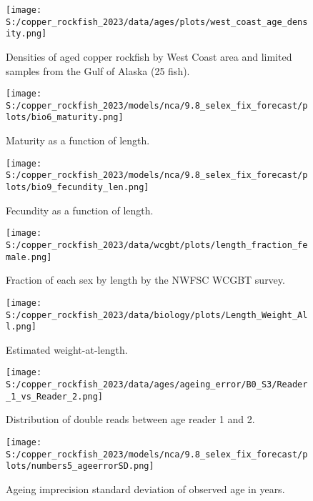 \documentclass[11pt,
  english,
  letterpaper,
]{article}
\begin{document}
\begin{figure}
\centering
\texttt{[image: S:/copper\_rockfish\_2023/data/ages/plots/west\_coast\_age\_density.png]}
\caption{Densities of aged copper rockfish by West Coast area and limited samples from the Gulf of Alaska (25 fish).\label{fig:west-coast-age-density}}
\end{figure}

\pagebreak

\begin{figure}
\centering
\texttt{[image: S:/copper\_rockfish\_2023/models/nca/9.8\_selex\_fix\_forecast/plots/bio6\_maturity.png]}
\caption{Maturity as a function of length.\label{fig:maturity}}
\end{figure}

\pagebreak

\begin{figure}
\centering
\texttt{[image: S:/copper\_rockfish\_2023/models/nca/9.8\_selex\_fix\_forecast/plots/bio9\_fecundity\_len.png]}
\caption{Fecundity as a function of length.\label{fig:fecundity}}
\end{figure}

\pagebreak

\begin{figure}
\centering
\texttt{[image: S:/copper\_rockfish\_2023/data/wcgbt/plots/length\_fraction\_female.png]}
\caption{Fraction of each sex by length by the NWFSC WCGBT survey.\label{fig:frac-sex-len}}
\end{figure}

\pagebreak

\begin{figure}
\centering
\texttt{[image: S:/copper\_rockfish\_2023/data/biology/plots/Length\_Weight\_All.png]}
\caption{Estimated weight-at-length.\label{fig:weight-length}}
\end{figure}

\pagebreak

\begin{figure}
\centering
\texttt{[image: S:/copper\_rockfish\_2023/data/ages/ageing\_error/B0\_S3/Reader\_1\_vs\_Reader\_2.png]}
\caption{Distribution of double reads between age reader 1 and 2.\label{fig:age-error-dist}}
\end{figure}

\pagebreak

\begin{figure}
\centering
\texttt{[image: S:/copper\_rockfish\_2023/models/nca/9.8\_selex\_fix\_forecast/plots/numbers5\_ageerrorSD.png]}
\caption{Ageing imprecision standard deviation of observed age in years.\label{fig:age-error}}
\end{figure}
\end{document}
